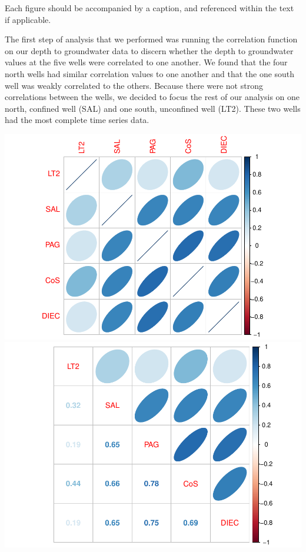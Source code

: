 \documentclass[
]{article}
\begin{document}
Each figure should be accompanied by a caption, and referenced within
the text if applicable.

The first step of analysis that we performed was running the correlation
function on our depth to groundwater data to discern whether the depth
to groundwater values at the five wells were correlated to one another.
We found that the four north wells had similar correlation values to one
another and that the one south well was weakly correlated to the others.
Because there were not strong correlations between the wells, we decided
to focus the rest of our analysis on one north, confined well (SAL) and
one south, unconfined well (LT2). These two wells had the most complete
time series data.

\includegraphics{Kaufman_McNeill_ENV797_Project_files/figure-latex/correlation plots-1.pdf}
\includegraphics{Kaufman_McNeill_ENV797_Project_files/figure-latex/correlation plots-2.pdf}
\end{document}
